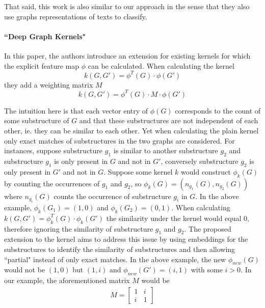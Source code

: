 That said, this work is also similar to our approach in the sense that they also use graphs representations of texts to classify.


\paragraph{``Deep Graph Kernels" \cite{Yanardag2015}}
In this paper, the authors introduce an extension for existing kernels for which the explicit feature map $\phi$ can be calculated.
When calculating the kernel
\begin{equation*}
k(G, G') = \phi^T(G) \cdot \phi(G')
\end{equation*}
they add a weighting matrix $M$
\begin{equation*}
k(G, G') = \phi^T(G) \cdot M \cdot \phi(G')
\end{equation*}

The intuition here is that each vector entry of $\phi(G)$ corresponds to the count of some substructure of $G$ and that these substructures are not independent of each other, ie. they can be similar to each other.
Yet when calculating the plain kernel only exact matches of substructures in the two graphs are considered.
For instances, suppose substructure $g_1$ is similar to another substructure $g_2$ and substructure $g_1$ is only present in $G$ and not in $G'$, conversely substructure $g_2$ is only present in $G'$ and not in $G$.
Suppose some kernel $k$ would construct $\phi_k(G)$ by counting the occurrences of $g_1$ and $g_2$, so $\phi_k(G) = (n_{g_1}(G), n_{g_2}(G))$ where $n_{g_i}(G)$ counts the occurrence of substructure $g_i$ in $G$.
In the above example, $\phi_k(G_1) = (1, 0)$ and $\phi_k(G_2) = (0, 1)$. When calculating $k(G, G') = \phi_k^T(G) \cdot \phi_k(G') $ the similarity under the kernel would equal 0, therefore ignoring the similarity of substructure $g_1$ and $g_2$.
The proposed extension to the kernel aims to address this issue by using embeddings for the substructures to identify the similarity of substructures and then allowing ``partial" instead of only exact matches.
In the above example, the new $\phi_{new}(G)$ would not be $(1, 0)$ but $(1, i)$ and $\phi_{new}(G') = (i, 1)$ with some $i > 0$.
In our example, the aforementioned matrix $M$ would be
\begin{align*}
M = \begin{bmatrix}
1 & i \\
i & 1
\end{bmatrix}
\end{align*}

